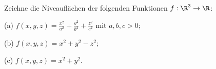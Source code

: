 \begin{prob}
Zeichne die Niveaufl\"achen der folgenden Funktionen $f:\R^3\to\R$:

(a) $f(x,y,z)=\frac{x^2}{a^2} + \frac{y^2}{b^2} + \frac{z^2}{c^2}$ mit $a,b,c>0$;

(b) $f(x,y,z) = x^2+y^2-z^2$;

(c) $f(x,y,z) = x^2+y^2$.
\end{prob}
